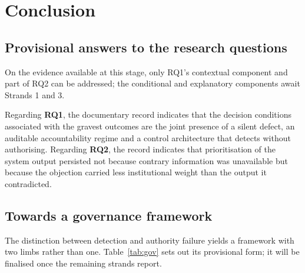 \documentclass[11pt,a4paper]{article}
\numberwithin{figure}{section}
\numberwithin{table}{section}
\begin{document}
\section{Conclusion}

\subsection{Provisional answers to the research questions}

On the evidence available at this stage, only RQ1's contextual component and part of RQ2 can be addressed;
the conditional and explanatory components await Strands 1 and 3.

Regarding \textbf{RQ1}, the documentary record indicates that the decision conditions associated with the
gravest outcomes are the joint presence of a silent defect, an auditable accountability regime and a control
architecture that detects without authorising. Regarding \textbf{RQ2}, the record indicates that
prioritisation of the system output persisted not because contrary information was unavailable but because
the objection carried less institutional weight than the output it contradicted.

\subsection{Towards a governance framework}

The distinction between detection and authority failure yields a framework with two limbs rather than one.
Table~\ref{tab:gov} sets out its provisional form; it will be finalised once the remaining strands report.
\end{document}
